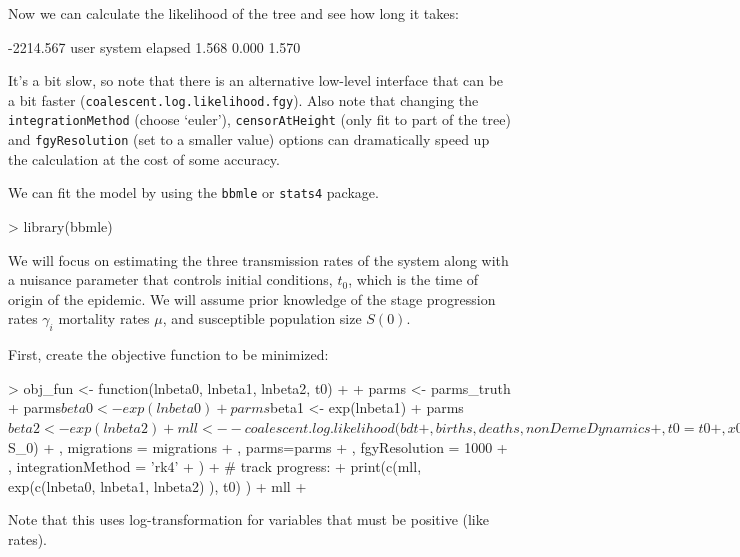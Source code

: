 \documentclass{article}
\begin{document}
Now we can calculate the likelihood of the tree and see how long it takes:
\begin{Schunk}
\begin{Soutput}
[1] -2214.567
   user  system elapsed 
  1.568   0.000   1.570 
\end{Soutput}
\end{Schunk}
It's a bit slow, so note that there is an alternative low-level interface that can be a bit faster (\texttt{coalescent.log.likelihood.fgy}). Also note that changing the \texttt{integrationMethod} (choose `euler'), \texttt{censorAtHeight} (only fit to part of the tree) and \texttt{fgyResolution} (set to a smaller value) options can dramatically speed up the calculation at the cost of some accuracy. 

We can fit the model by using the \texttt{bbmle} or \texttt{stats4} package. 
\begin{Schunk}
\begin{Sinput}
> library(bbmle)
\end{Sinput}
\end{Schunk}
We will focus on estimating the three transmission rates of the system along with a nuisance parameter that controls initial conditions, $t_0$, which is the time of origin of the epidemic. We will assume prior knowledge of the stage progression rates $\gamma_i$ mortality rates $\mu$, and susceptible population size $S(0)$.


First, create the objective function to be minimized:
\begin{Schunk}
\begin{Sinput}
> obj_fun <- function(lnbeta0, lnbeta1, lnbeta2, t0)
+ {
+ 	parms <- parms_truth
+ 	parms$beta0 <- exp(lnbeta0)
+ 	parms$beta1 <- exp(lnbeta1)
+ 	parms$beta2 <- exp(lnbeta2)
+ 	mll <- -coalescent.log.likelihood( bdt
+ 		 , births, deaths, nonDemeDynamics
+ 		 , t0 = t0
+ 		 , x0=c(I0=1, I1=.01, I2=.01, S = parms$S_0)
+ 		 , migrations = migrations
+ 		 , parms=parms
+ 		 , fgyResolution = 1000
+ 		 , integrationMethod = 'rk4'
+ 	)
+ 	# track progress: 
+ 	print(c(mll, exp(c(lnbeta0, lnbeta1, lnbeta2) ), t0) )
+ 	mll
+ }
\end{Sinput}
\end{Schunk}
Note that this uses log-transformation for variables that must be positive (like rates).
\end{document}
